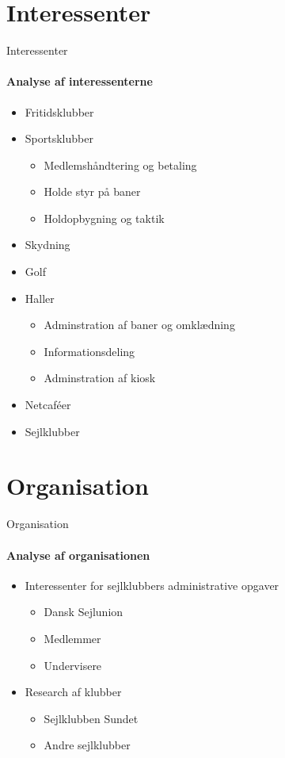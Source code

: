 \section{Interessenter}
\begin{frame}{Interessenter}
	\framesubtitle{Analyse af interessenterne}
	
	\begin{itemize}
		\item Fritidsklubber
		\item Sportsklubber
		\begin{itemize}
			\item Medlemshåndtering og betaling
			\item Holde styr på baner
			\item Holdopbygning og taktik
		\end{itemize}
		\item Skydning
		\item Golf
		\item Haller
		\begin{itemize}
			\item Adminstration af baner og omklædning
			\item Informationsdeling
			\item Adminstration af kiosk	
		\end{itemize}
		\item Netcaféer
		\item Sejlklubber
	\end{itemize}


\end{frame}

\section{Organisation}
\begin{frame}{Organisation}
	\framesubtitle{Analyse af organisationen}
		\begin{itemize}
			\item Interessenter for sejlklubbers administrative opgaver
			\begin{itemize}
				\item Dansk Sejlunion
				\item Medlemmer
				\item Undervisere
			\end{itemize}
			\item Research af klubber
			\begin{itemize}
				\item Sejlklubben Sundet
				\item Andre sejlklubber
			\end{itemize}
		\end{itemize}

\end{frame}
